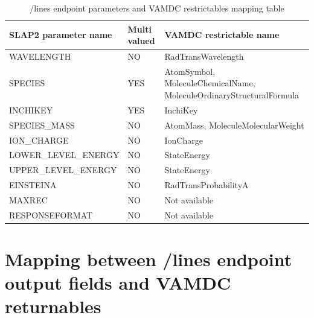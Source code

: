 \documentclass[11pt,a4paper]{ivoa}
\begin{document}
\begin{table}[H]
\centering
\small
\begin{tabularx}{\textwidth}{|p{4.5cm}|p{1.5cm}|>{\raggedright\arraybackslash}X|}
\hline
\textbf{\headerstrut SLAP2 parameter name} & \textbf{Multi valued} & \textbf{VAMDC restrictable name}\\
\hline
WAVELENGTH           & NO  & RadTransWavelength                    \\
SPECIES              & YES & AtomSymbol, Molecule\-Chemical\-Name, Molecule\-Ordinary\-Structural\-Formula \\
INCHIKEY             & YES & InchiKey                              \\
SPECIES\_MASS        & NO  & AtomMass, Molecule\-Molecular\-Weight \\
ION\_CHARGE          & NO  & IonCharge                             \\
LOWER\_LEVEL\_ENERGY & NO  & StateEnergy                           \\
UPPER\_LEVEL\_ENERGY & NO  & StateEnergy                           \\
EINSTEINA            & NO  & RadTransProbabilityA                  \\
MAXREC               & NO  & Not available                         \\
RESPONSEFORMAT       & NO  & Not available                         \\
\hline
\end{tabularx}
\caption{ /lines endpoint parameters and VAMDC restrictables mapping table }
\end{table}


\section{Mapping between /lines endpoint output fields and VAMDC returnables}
\end{document}
